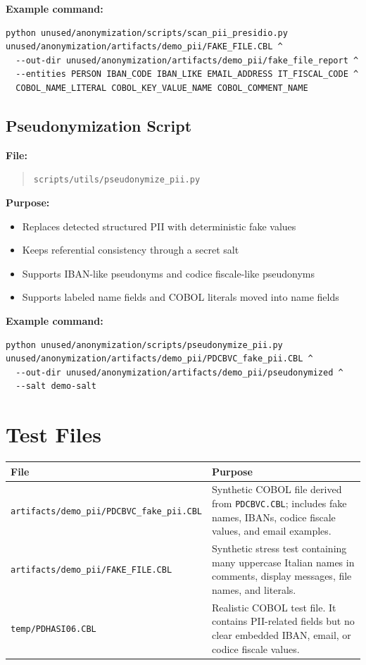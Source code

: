 ﻿\documentclass[11pt,a4paper]{article}
\newcommand{\code}[1]{\texttt{#1}}
\begin{document}
\textbf{Example command:}

\begin{verbatim}
python unused/anonymization/scripts/scan_pii_presidio.py unused/anonymization/artifacts/demo_pii/FAKE_FILE.CBL ^
  --out-dir unused/anonymization/artifacts/demo_pii/fake_file_report ^
  --entities PERSON IBAN_CODE IBAN_LIKE EMAIL_ADDRESS IT_FISCAL_CODE ^
  COBOL_NAME_LITERAL COBOL_KEY_VALUE_NAME COBOL_COMMENT_NAME
\end{verbatim}

\subsection{Pseudonymization Script}

\textbf{File:}

\begin{quote}
\code{scripts/utils/pseudonymize\_pii.py}
\end{quote}

\textbf{Purpose:}

\begin{itemize}
  \item Replaces detected structured PII with deterministic fake values
  \item Keeps referential consistency through a secret salt
  \item Supports IBAN-like pseudonyms and codice fiscale-like pseudonyms
  \item Supports labeled name fields and COBOL literals moved into name fields
\end{itemize}

\textbf{Example command:}

\begin{verbatim}
python unused/anonymization/scripts/pseudonymize_pii.py unused/anonymization/artifacts/demo_pii/PDCBVC_fake_pii.CBL ^
  --out-dir unused/anonymization/artifacts/demo_pii/pseudonymized ^
  --salt demo-salt
\end{verbatim}

\section{Test Files}

\begin{longtable}{p{}p{}}
\textbf{File} & \textbf{Purpose} \\
\hline
\code{artifacts/demo\_pii/PDCBVC\_fake\_pii.CBL} & Synthetic COBOL file derived from \code{PDCBVC.CBL}; includes fake names, IBANs, codice fiscale values, and email examples. \\
\code{artifacts/demo\_pii/FAKE\_FILE.CBL} & Synthetic stress test containing many uppercase Italian names in comments, display messages, file names, and literals. \\
\code{temp/PDHASI06.CBL} & Realistic COBOL test file. It contains PII-related fields but no clear embedded IBAN, email, or codice fiscale values. \\
\end{longtable}
\end{document}
